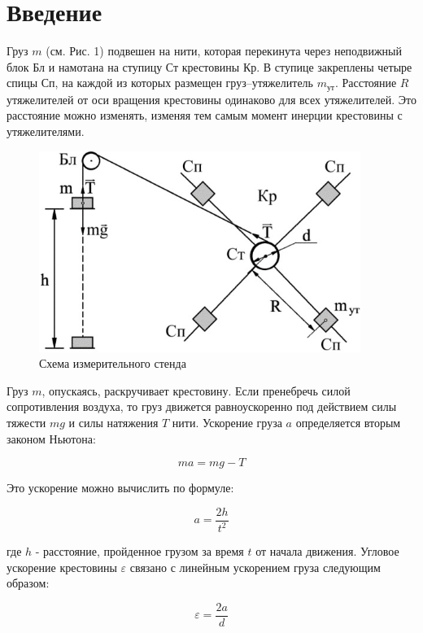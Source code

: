 \documentclass[a4paper]{article}
\begin{document}
\section{Введение}

Груз $m$ (см. Рис. 1) подвешен на нити, которая перекинута через неподвижный блок Бл и намотана на ступицу Ст крестовины Кр. В ступице закреплены четыре спицы Сп, на каждой из которых размещен груз–утяжелитель $m_{\text{ут}}$. Расстояние $R$ утяжелителей от оси вращения крестовины одинаково для всех утяжелителей. Это расстояние можно изменять, изменяя тем самым момент инерции крестовины с утяжелителями.

\begin{figure}[H]
	\centering
	\includegraphics[scale=0.5]{pick.png}
	\caption{Схема измерительного стенда}
\end{figure}


Груз $m$, опускаясь, раскручивает крестовину. Если пренебречь силой сопротивления воздуха, то груз движется равноускоренно под действием силы тяжести $mg$ и силы натяжения $T$ нити. Ускорение груза $a$ определяется вторым законом Ньютона:

\begin{equation}
m a = mg - T
\end{equation}


Это ускорение можно вычислить по формуле:

\begin{equation}
a = \frac{2h}{t^2}
\end{equation}


где $h$ - расстояние, пройденное грузом за время $t$ от начала движения. Угловое ускорение крестовины $\varepsilon$ связано с линейным ускорением груза следующим образом:


\begin{equation}
\varepsilon = \frac{2a}{d}
\end{equation}
\end{document}
